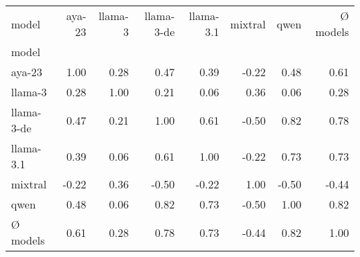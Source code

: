 \begin{tabular}{lrrrrrrr}
\toprule
model & aya-23 & llama-3 & llama-3-de & llama-3.1 & mixtral & qwen & Ø models \\
model &  &  &  &  &  &  &  \\
\midrule
aya-23 & 1.00 & 0.28 & 0.47 & 0.39 & -0.22 & 0.48 & 0.61 \\
llama-3 & 0.28 & 1.00 & 0.21 & 0.06 & 0.36 & 0.06 & 0.28 \\
llama-3-de & 0.47 & 0.21 & 1.00 & 0.61 & -0.50 & 0.82 & 0.78 \\
llama-3.1 & 0.39 & 0.06 & 0.61 & 1.00 & -0.22 & 0.73 & 0.73 \\
mixtral & -0.22 & 0.36 & -0.50 & -0.22 & 1.00 & -0.50 & -0.44 \\
qwen & 0.48 & 0.06 & 0.82 & 0.73 & -0.50 & 1.00 & 0.82 \\
Ø models & 0.61 & 0.28 & 0.78 & 0.73 & -0.44 & 0.82 & 1.00 \\
\bottomrule
\end{tabular}
